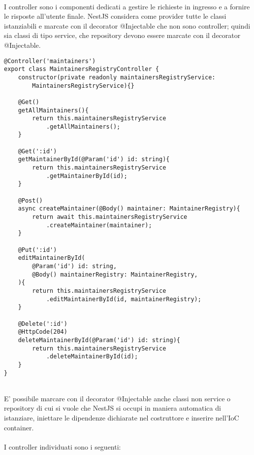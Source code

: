 \leavevmode\newline
\\
I controller sono i componenti dedicati a gestire le richieste in ingresso e a fornire le risposte all'utente
finale. NestJS considera come provider tutte le classi istanziabili e marcate con il decorator 
@Injectable che non sono controller; quindi sia classi di tipo service, che repository devono essere marcate
con il decorator @Injectable. 
\\
\begin{lstlisting}
@Controller('maintainers')
export class MaintainersRegistryController {
    constructor(private readonly maintainersRegistryService: 
        MaintainersRegistryService){}

    @Get()
    getAllMaintainers(){
        return this.maintainersRegistryService
            .getAllMaintainers();
    }

    @Get(':id')
    getMaintainerById(@Param('id') id: string){
        return this.maintainersRegistryService
            .getMaintainerById(id);
    }

    @Post()
    async createMaintainer(@Body() maintainer: MaintainerRegistry){
        return await this.maintainersRegistryService
            .createMaintainer(maintainer);
    }

    @Put(':id')
    editMaintainerById(
        @Param('id') id: string,
        @Body() maintainerRegistry: MaintainerRegistry,
    ){
        return this.maintainersRegistryService
            .editMaintainerById(id, maintainerRegistry);
    }

    @Delete(':id')
    @HttpCode(204)
    deleteMaintainerById(@Param('id') id: string){
        return this.maintainersRegistryService
            .deleteMaintainerById(id);
    }
}
\end{lstlisting}
\leavevmode\newline
\\
E' possibile marcare con il decorator @Injectable
anche classi non service o repository di cui si vuole che NestJS si occupi
in maniera automatica di istanziare, iniettare le dipendenze dichiarate nel costruttore e inserire nell'IoC 
container.
\\\\
I controller individuati sono i seguenti:
